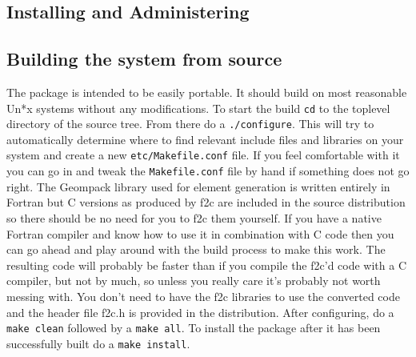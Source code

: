 
\begin{appendix}

\newpage{\pagestyle{empty}\cleardoublepage}

\chapter{Installing and Administering \felt{}}
\label{appendix.install}

\section{Building the \felt{} system from source}

The \felt{} package is intended to be easily portable.  It should build on most 
reasonable Un*x systems without any modifications.  To start the build 
{\tt cd} to the toplevel directory of the \felt{} source tree.  From there 
do a {\tt ./configure}.
This will try to automatically determine where to find relevant include files
and libraries on your system and create a new {\tt etc/Makefile.conf} file.  
If you feel comfortable with it you can go in and tweak 
the {\tt Makefile.conf} file by hand if something does not go right.  
The Geompack library used for element generation is written 
entirely in Fortran but C versions as produced by f2c are included in the 
source distribution so there should be no need for you to f2c them yourself.  
If you have a native Fortran compiler and know how to use it in combination
with C code then you can go ahead and play around with the build process to
make this work. The resulting code will probably be faster than if you 
compile the f2c'd code with a C compiler, but not by much, so unless you 
really care it's probably not worth messing with.  You don't need to have the 
f2c libraries 
to use the converted code and the header file f2c.h is provided in the 
distribution. After configuring, do a {\tt make clean} followed by a 
{\tt make all}.  To install the package after it has been successfully 
built do a {\tt make install}.	


\end{appendix}
